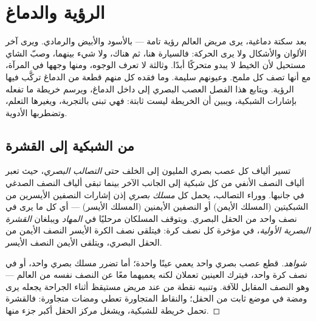 \chapter{الرؤية والدماغ}\label{ch:g11:vision-and-brain}

بعد سكتة دماغية، يرى مريض العالم رؤية تامة --- بالأسود والأبيض
والرمادي. ويرى آخر الألوان والأشكال ولا يرى الحركة: فالسيارة هنا، ثم
هناك، ولا شيء بينهما، وصبّ الشاي مستحيل لأن الخيط لا يبدو متحركًا
أبدًا. وثالثة لا تعرف الوجوه، ومنها وجهها في المرآة، مع أنها تصف كل
ملمح. وعيونهم سليمة. وما فقده كل منهم قطعة من الدماغ تركَّب فيها
الرؤية. ويتابع هذا الفصل العصب البصري إلى داخل الدماغ، ويرسم خريطة ما
تفعله  بإشارات الشبكية، ويبين أن الخريطة ليست ثابتة:
فهي تبنى بالتجربة، ويغيرها التعلم، وتضطربها الأدوية.

\section{من الشبكية إلى القشرة}

\begin{proposition}\label{prop:g11:vision-and-brain:pathway}
تسير ألياف كل عصب بصري المليون إلى الخلف حتى \emph{التصالب البصري}،
حيث تعبر ألياف النصف الأنفي من كل شبكية إلى الجانب الآخر بينما تبقى
ألياف النصف الصدغي في جانبها. ووراء التصالب، يحمل كل \emph{مسلك بصري}
إذن إشارات النصفين الأيسرين من الشبكيتين (المسلك الأيمن) أو النصفين
الأيمنين (المسلك الأيسر) --- أي كل ما يرى في نصف واحد من الحقل البصري.
ويتوقف المسلكان مرحليًا في \emph{المهاد} ويبلغان \emph{القشرة البصرية
الأولية}، في مؤخرة كل نصف كرة: فيتلقى نصف الكرة
الأيسر النصف الأيمن من الحقل البصري، ويتلقى الأيمن النصف الأيسر.
\end{proposition}
\begin{proof}[شواهد]
قطع عصب بصري واحد يعمي عينًا واحدة؛ أما تضرر مسلك بصري واحد، أو  في نصف كرة واحد، فيترك العينين تعملان لكنه يعميهما معًا عن
النصف نفسه من العالم --- وهو النصف المقابل للآفة. وتنبيه نقطة من  عند مريض مستيقظ أثناء الجراحة يجعله يرى ومضة في موضع ثابت من
الحقل؛ والنقاط المتجاورة تعطي ومضات متجاورة: فالقشرة تحمل خريطة
للشبكية، ويشغل مركز الحقل أكبر جزء منها.
\end{proof}

